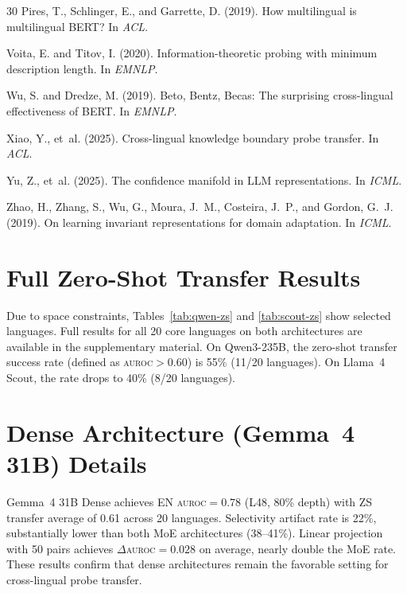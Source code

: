 \documentclass[11pt,a4paper]{article}
\newcommand{\auroc}{\textsc{auroc}}
\begin{document}
\begin{thebibliography}{30}
Pires, T., Schlinger, E., and Garrette, D. (2019).
\newblock How multilingual is multilingual BERT?
\newblock In \emph{ACL}.

Voita, E. and Titov, I. (2020).
\newblock Information-theoretic probing with minimum description length.
\newblock In \emph{EMNLP}.

Wu, S. and Dredze, M. (2019).
\newblock Beto, Bentz, Becas: The surprising cross-lingual effectiveness of BERT.
\newblock In \emph{EMNLP}.

Xiao, Y., et~al. (2025).
\newblock Cross-lingual knowledge boundary probe transfer.
\newblock In \emph{ACL}.

Yu, Z., et~al. (2025).
\newblock The confidence manifold in LLM representations.
\newblock In \emph{ICML}.

Zhao, H., Zhang, S., Wu, G., Moura, J.~M., Costeira, J.~P., and Gordon, G.~J. (2019).
\newblock On learning invariant representations for domain adaptation.
\newblock In \emph{ICML}.
\end{thebibliography}

\appendix

\section{Full Zero-Shot Transfer Results}
\label{app:full-zs}

Due to space constraints, Tables~\ref{tab:qwen-zs} and \ref{tab:scout-zs} show selected languages.
Full results for all 20 core languages on both architectures are available in the supplementary material.
On Qwen3-235B, the zero-shot transfer success rate (defined as \auroc{}${>}0.60$) is 55\% (11/20 languages).
On Llama~4 Scout, the rate drops to 40\% (8/20 languages).

\section{Dense Architecture (Gemma~4 31B) Details}
\label{app:gemma}

Gemma~4 31B Dense achieves EN \auroc{}$=0.78$ (L48, 80\% depth) with ZS transfer average of 0.61 across 20 languages.
Selectivity artifact rate is 22\%, substantially lower than both MoE architectures (38--41\%).
Linear projection with 50 pairs achieves $\Delta$\auroc{}$=0.028$ on average, nearly double the MoE rate.
These results confirm that dense architectures remain the favorable setting for cross-lingual probe transfer.
\end{document}
